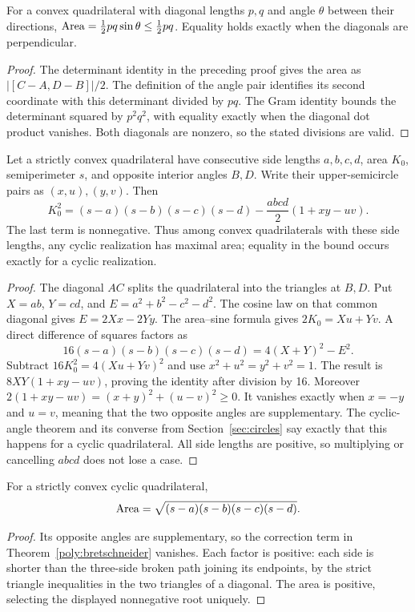 \begin{theorem}\label{poly:diagonal-area}
For a convex quadrilateral with diagonal lengths $p,q$ and angle $\theta$
between their directions,
$\operatorname{Area}=\tfrac12pq\sin\theta\le\tfrac12pq$.
Equality holds exactly when the diagonals are perpendicular.
\end{theorem}
\begin{proof}
The determinant identity in the preceding proof gives the area as
$|[C-A,D-B]|/2$. The definition of the angle pair identifies its
second coordinate with this determinant divided by $pq$.
The Gram identity bounds the determinant squared by $p^2q^2$,
with equality exactly when the diagonal dot product vanishes.
Both diagonals are nonzero, so the stated divisions are valid.
\end{proof}

\begin{theorem}
\label{poly:bretschneider}
Let a strictly convex quadrilateral have consecutive side lengths
$a,b,c,d$, area $K_0$, semiperimeter $s$, and opposite interior angles
$B,D$. Write their upper-semicircle pairs as $(x,u),(y,v)$.
Then
\[
 K_0^2=(s-a)(s-b)(s-c)(s-d)
          -\frac{abcd}{2}(1+xy-uv).
\]
The last term is nonnegative. Thus among convex quadrilaterals with these
side lengths, any cyclic realization has maximal area; equality in the
bound occurs exactly for a cyclic realization.
\end{theorem}
\begin{proof}
The diagonal $AC$ splits the quadrilateral into the triangles at $B,D$.
Put $X=ab$, $Y=cd$, and $E=a^2+b^2-c^2-d^2$.
The cosine law on that common diagonal gives $E=2Xx-2Yy$.
The area--sine formula gives $2K_0=Xu+Yv$. A direct difference of
squares factors as
\[
 16(s-a)(s-b)(s-c)(s-d)=4(X+Y)^2-E^2.
\]
Subtract $16K_0^2=4(Xu+Yv)^2$ and use $x^2+u^2=y^2+v^2=1$.
The result is $8XY(1+xy-uv)$, proving the identity after division by
16. Moreover
$2(1+xy-uv)=(x+y)^2+(u-v)^2\ge0$.
It vanishes exactly when $x=-y$ and $u=v$, meaning that the two
opposite angles are supplementary. The cyclic-angle theorem and its
converse from Section~\ref{sec:circles} say exactly that this happens
for a cyclic quadrilateral. All side lengths are positive, so multiplying
or cancelling $abcd$ does not lose a case.
\end{proof}

\begin{corollary}\label{poly:brahmagupta}
For a strictly convex cyclic quadrilateral,
\[
 \operatorname{Area}=\sqrt{(s-a)(s-b)(s-c)(s-d)}.
\]
\end{corollary}
\begin{proof}
Its opposite angles are supplementary, so the correction term in
Theorem~\ref{poly:bretschneider} vanishes. Each factor is positive:
each side is shorter than the three-side broken path joining its endpoints,
by the strict triangle inequalities in the two triangles of a diagonal.
The area is positive, selecting the displayed nonnegative root uniquely.
\end{proof}

